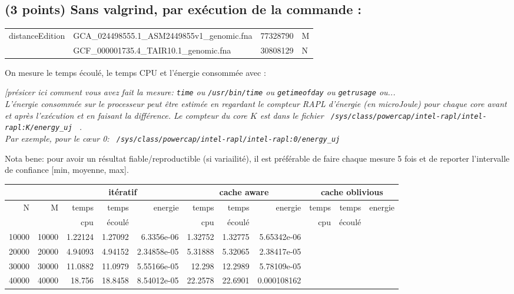\documentclass[10pt,a4paper]{article}
\begin{document}
\subsection{(3 points) Sans valgrind, par exécution de la commande :}
{\tt \begin{tabular}{llll}
distanceEdition & GCA\_024498555.1\_ASM2449855v1\_genomic.fna & 77328790 & M \\
                & GCF\_000001735.4\_TAIR10.1\_genomic.fna     & 30808129 & N
\end{tabular}}

On mesure le temps écoulé, le temps CPU et l'énergie consommée avec : {\em  [présicer ici comment vous avez fait la mesure:
{\tt time} 
ou {\tt /usr/bin/time}
ou {\tt getimeofday}
ou {\tt getrusage}
ou... \\
L'énergie consommée sur le processeur peut être estimée en regardant le compteur RAPL d'énergie (en microJoule)
pour chaque core avant et après l'exécution et en faisant la différence.
Le compteur du core $K$ est dans le fichier 
\verb+ /sys/class/powercap/intel-rapl/intel-rapl:K/energy_uj + .\\
Par exemple, pour le c{\oe}ur 0: 
\verb+ /sys/class/powercap/intel-rapl/intel-rapl:0/energy_uj +

Nota bene: pour avoir un résultat fiable/reproductible (si variailité), 
il est préférable de faire chaque mesure 5 fois et de reporter l'intervalle
de confiance [min, moyenne, max]. 

\begin{tabular}{|r|r||r|r|r||r|r|r||r|r|r||}
\hline
 \multicolumn{2}{|c||}{ } 
& \multicolumn{3}{c||}{itératif}
& \multicolumn{3}{c||}{cache aware}
& \multicolumn{3}{c||}{cache oblivious}
\\ \hline
N & M 
& temps   & temps & energie       %
& temps   & temps & energie       %
& temps   & temps & energie       %
\\
& 
& cpu     & écoulé&               %
& cpu     & écoulé&               %
& cpu     & écoulé&               %
\\ \hline
\hline
10000 & 10000 
& 1.22124& 1.27092&  6.3356e-06%
&1.32752 &1.32775 &5.65342e-06 %
&  &  &   %
\\ \hline
20000 & 20000 
& 4.94093& 4.94152& 2.34858e-05 %
&5.31888 & 5.32065& 2.38417e-05%
&  &  &   %
\\ \hline
30000 & 30000 
&11.0882 &11.0979 &5.55166e-05  %
& 12.298&12.2989 &5.78109e-05 %
&  &  &   %
\\ \hline
40000 & 40000 
&18.756 & 18.8458&8.54012e-05 %
& 22.2578& 22.6901& 0.000108162%
&  &  &   %
\\ \hline
\hline
\end{tabular}
}
\end{document}
